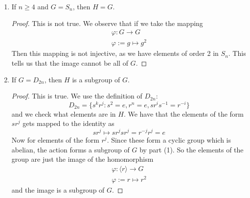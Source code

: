 \documentclass{article}
\begin{document}
\begin{enumerate}
	\item If $n \geq  4$ and $G = S_{n}$, then $H = G$.
		\begin{proof}
			This is not true. We observe that if we take the mapping
			\begin{align*}
				\varphi : G \rightarrow G \\
				\varphi := g \mapsto g^{2} 
			\end{align*}
			Then this mapping is not injective, as we have elements of order 2 in $S_{n}$. This tells us that the image cannot be all of $G$. 
		\end{proof}

	\item If $G = D_{2n}$, then $H$ is a subgroup of $G$.
		\begin{proof}
			This is true. We use the definition of $D_{2n}$:
			\begin{equation*}
				D_{2n} = \{ s^{k}r^{j} : s^{2} = e, r^{n} = e, sr^{i}s^{-1} = r^{-i}\}
			\end{equation*}
			and we check what elements are in $H$. We have that the elements of the form $sr^{j}$ gets mapped to the identity as
			\begin{equation*}
				sr^{j} \mapsto sr^{j}sr^{j} = r^{-j}r^{j} = e
			\end{equation*}
			Now for elements of the form $r^{j}$. Since these form a cyclic group which is abelian, the action forms a subgroup of $G$ by part (1). So the elements of the group are just the image of the homomorphism
			\begin{align*}
				\varphi : \langle r \rangle \rightarrow G \\
				\varphi := r \mapsto r^{2}
			\end{align*}
			and the image is a subgroup of $G$.
		\end{proof}
\end{enumerate}
\end{document}
